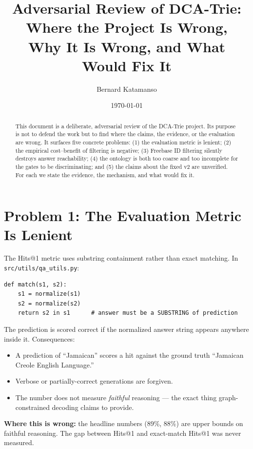 \documentclass[11pt,a4paper]{article}
\title{Adversarial Review of DCA-Trie:\\Where the Project Is Wrong,\\
Why It Is Wrong, and What Would Fix It}
\author{Bernard Katamanso}
\date{\today}
\begin{document}
\maketitle

\begin{abstract}
This document is a deliberate, adversarial review of the DCA-Trie
project.  Its purpose is not to defend the work but to find where the
claims, the evidence, or the evaluation are wrong.  It surfaces five
concrete problems: (1) the evaluation metric is lenient; (2) the
empirical cost--benefit of filtering is negative; (3) Freebase ID
filtering silently destroys answer reachability; (4) the ontology is
both too coarse and too incomplete for the gates to be discriminating;
and (5) the claims about the fixed v2 are unverified.  For each we
state the evidence, the mechanism, and what would fix it.
\end{abstract}

\section{Problem 1: The Evaluation Metric Is Lenient}

The Hits@1 metric uses substring containment rather than exact
matching.  In \texttt{src/utils/qa\_utils.py}:

\begin{verbatim}
def match(s1, s2):
    s1 = normalize(s1)
    s2 = normalize(s2)
    return s2 in s1      # answer must be a SUBSTRING of prediction
\end{verbatim}

The prediction is scored correct if the normalized answer string
appears anywhere inside it.  Consequences:

\begin{itemize}
  \item A prediction of ``Jamaican'' scores a hit against the
    ground truth ``Jamaican Creole English Language.''
  \item Verbose or partially-correct generations are forgiven.
  \item The number does not measure \emph{faithful} reasoning --- the
    exact thing graph-constrained decoding claims to provide.
\end{itemize}

\textbf{Where this is wrong:} the headline numbers (89\%, 88\%) are
upper bounds on faithful reasoning.  The gap between Hits@1 and
exact-match Hits@1 was never measured.
\end{document}
